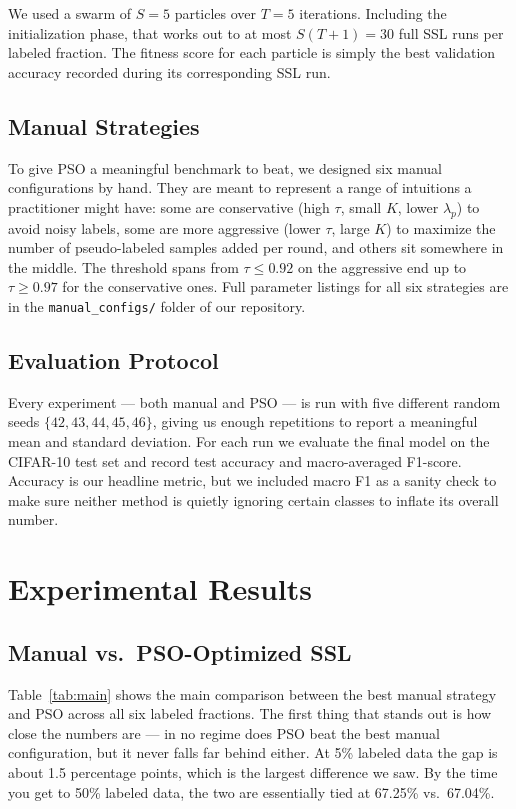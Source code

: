 \documentclass[journal]{IEEEtran}
\begin{document}
We used a swarm of $S = 5$ particles over $T = 5$ iterations. Including the
initialization phase, that works out to at most $S(T+1) = 30$ full SSL runs
per labeled fraction. The fitness score for each particle is simply the best
validation accuracy recorded during its corresponding SSL run.

\subsection{Manual Strategies}

To give PSO a meaningful benchmark to beat, we designed six manual
configurations by hand. They are meant to represent a range of intuitions a
practitioner might have: some are conservative (high $\tau$, small $K$,
lower $\lambda_p$) to avoid noisy labels, some are more aggressive (lower
$\tau$, large $K$) to maximize the number of pseudo-labeled samples added per
round, and others sit somewhere in the middle. The threshold spans from
$\tau \leq 0.92$ on the aggressive end up to $\tau \geq 0.97$ for the
conservative ones. Full parameter listings for all six strategies are in the
\texttt{manual\_configs/} folder of our repository.

\subsection{Evaluation Protocol}

Every experiment --- both manual and PSO --- is run with five different random
seeds $\{42, 43, 44, 45, 46\}$, giving us enough repetitions to report a
meaningful mean and standard deviation. For each run we evaluate the final
model on the CIFAR-10 test set and record test accuracy and macro-averaged
F1-score. Accuracy is our headline metric, but we included macro F1 as a
sanity check to make sure neither method is quietly ignoring certain classes to inflate its overall number.



\section{Experimental Results}

\subsection{Manual vs.\ PSO-Optimized SSL}

Table~\ref{tab:main} shows the main comparison between the best manual
strategy and PSO across all six labeled fractions. The first thing that stands
out is how close the numbers are --- in no regime does PSO beat the best
manual configuration, but it never falls far behind either. At 5\% labeled
data the gap is about 1.5 percentage points, which is the largest difference
we saw. By the time you get to 50\% labeled data, the two are essentially
tied at 67.25\% vs.\ 67.04\%.
\end{document}
